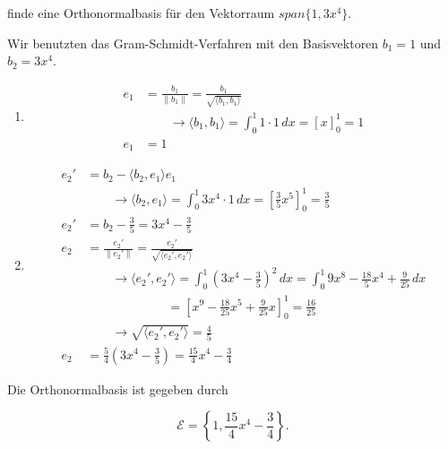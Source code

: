 finde eine Orthonormalbasis für den Vektorraum \( span \{ 1, 3x^4 \} \).

\vspace{1\baselineskip}

Wir benutzten das Gram-Schmidt-Verfahren mit den Basisvektoren \( b_1 = 1 \) und \( b_2 = 3x^4 \).

\begin{enumerate}
    \item 
    \begin{equation*}
        \begin{aligned}
            e_1 &= \frac{b_1}{\| b_1 \|} = \frac{b_1}{\sqrt{\langle b_1, b_1 \rangle}} \\[1em]
            & \qquad \to \langle b_1, b_1 \rangle = \int_{0}^{1} 1 \cdot 1 \, dx = \left[ x \right]_0^1 = 1 \\[1em]
            e_1 &= 1
        \end{aligned}
    \end{equation*}
    \item 
    \begin{equation*}
        \begin{aligned}
            e_2' &= b_2 - \langle b_2, e_1 \rangle e_1 \\[1em]
            & \qquad \to \langle b_2, e_1 \rangle = \int_{0}^{1} 3x^4 \cdot 1 \, dx = \left[ \frac{3}{5} x^5 \right]_0^1 = \frac{3}{5} \\[1em]
            e_2' &= b_2 - \frac{3}{5} = 3x^4 - \frac{3}{5} \\[2em]
            e_2 &= \frac{e_2'}{\| e_2' \|} = \frac{e_2'}{\sqrt{\langle e_2', e_2' \rangle}} \\[1em]
            & \qquad \to \langle e_2', e_2' \rangle = \int_{0}^{1} \left( 3x^4 - \frac{3}{5} \right)^2 \, dx = \int_{0}^{1} 9x^8 - \frac{18}{5}x^4 + \frac{9}{25} \, dx \\[1em]
            & \qquad \qquad \qquad \ \ = \left[ x^9 - \frac{18}{25} x^5 + \frac{9}{25} x \right]_0^1 = \frac{16}{25} \\[1em]
            & \qquad \to \sqrt{\langle e_2', e_2' \rangle} = \frac{4}{5} \\[1em]
            e_2 &= \frac{5}{4} \left(3x^4 - \frac{3}{5} \right) = \frac{15}{4}x^4 - \frac{3}{4}
        \end{aligned}
    \end{equation*}
\end{enumerate}

\vspace{1\baselineskip}

Die Orthonormalbasis ist gegeben durch 

\begin{equation*}
    \mathcal{E} = \left\{ 1, \frac{15}{4}x^4 - \frac{3}{4} \right\}.
\end{equation*}